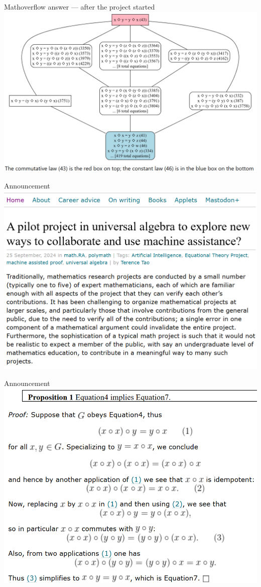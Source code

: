 \documentclass{beamer}
\begin{document}
\begin{frame}{Mathoverflow answer --- after the project started}
\includegraphics[width=\textwidth]{mathoverflow_tao.png}
\end{frame}


\begin{frame}{Announcement}
\includegraphics[width=\textwidth]{initial_announcement.png}
\end{frame}


\begin{frame}{Announcement}
\includegraphics[width=\textwidth]{initial_implication.png}
\end{frame}
\end{document}
